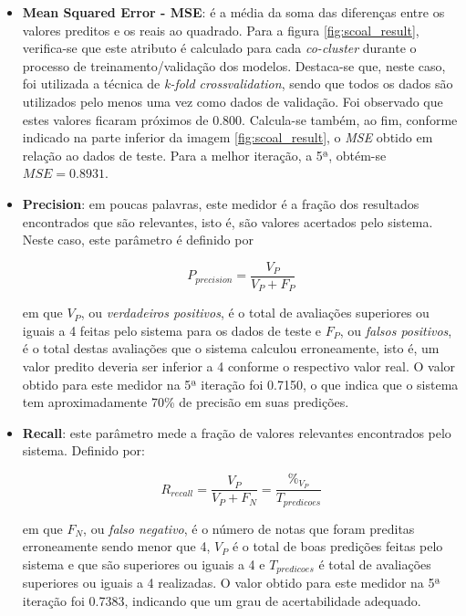 \begin{itemize}
  \item \textbf{Mean Squared Error - MSE}: é a média da soma das diferenças
  entre os valores preditos e os reais ao quadrado. Para a figura
  \ref{fig:scoal_result},  verifica-se que este atributo é calculado para cada
  \textit{co-cluster} durante o processo de treinamento/validação dos modelos.
  Destaca-se que, neste caso, foi utilizada a técnica de \textit{k-fold
  crossvalidation}, sendo que todos os dados são utilizados pelo menos uma vez
  como dados de validação. Foi observado que estes valores ficaram próximos de
  0.800. Calcula-se também, ao fim, conforme indicado na parte inferior da
  imagem \ref{fig:scoal_result}, o \textit{MSE} obtido em relação ao dados de teste.
  Para a melhor iteração, a 5ª, obtém-se \(MSE = 0.8931\).
 
  \item \textbf{Precision}: em poucas palavras, este medidor é a fração dos
  resultados encontrados que são relevantes, isto é, são valores acertados pelo
  sistema. Neste caso, este parâmetro é definido por
 
  \begin{equation}
  P_{precision} = \frac{V_P}{V_P + F_P}
  \end{equation}
 
 
  em que \(V_P\), ou \textit{verdadeiros positivos}, é o total de avaliações
  superiores ou iguais a 4 feitas pelo sistema para os dados de teste e
  \(F_P\), ou \textit{falsos positivos}, é o total destas avaliações que o
  sistema calculou erroneamente, isto é, um valor predito deveria ser inferior
  a 4 conforme o respectivo  valor real. O valor obtido para este medidor na 5ª
  iteração foi 0.7150, o que indica que o sistema tem aproximadamente 70\% de
  precisão em suas predições.
 
  \item \textbf{Recall}: este parâmetro mede a fração de valores relevantes
  encontrados pelo sistema. Definido por:
 
  \begin{equation}
  R_{recall} = \frac{V_P}{V_P + F_N}  = \frac{\%_{V_P}}{T_{predicoes}}
  \end{equation}
 
  em que \(F_N\), ou \textit{falso negativo}, é o número de notas que foram
  preditas erroneamente sendo menor que 4,  \(V_P\) é o total de boas predições
  feitas pelo sistema e que são superiores ou iguais a 4 e \(T_{predicoes}\) é
  total de avaliações superiores ou iguais a 4 realizadas.  O valor obtido para
  este medidor na 5ª iteração foi 0.7383, indicando que um grau de
  acertabilidade adequado.
 
\end{itemize}